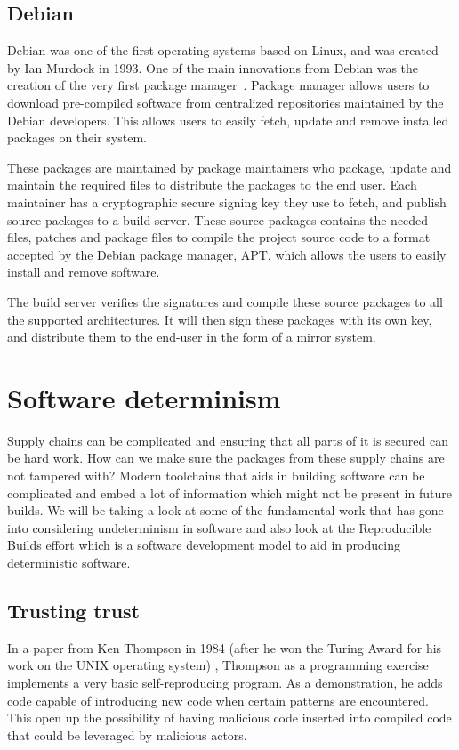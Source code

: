 \documentclass[../Main/thesis.tex]{subfiles}
\begin{document}
\subsection*{Debian}
Debian was one of the first operating systems based on Linux, and was created by
Ian Murdock in 1993. One of the main innovations from Debian was the creation of
the very first package manager~\cite{debian-history}. Package manager allows
users to download pre-compiled software from centralized repositories maintained
by the Debian developers. This allows users to easily fetch, update and remove
installed packages on their system.

These packages are maintained by package maintainers who package, update and
maintain the required files to distribute the packages to the end user. Each
maintainer has a cryptographic secure signing key they use to fetch, and publish
source packages to a build server. These source packages contains the needed
files, patches and package files to compile the project source code to a format
accepted by the Debian package manager, APT, which allows the users to easily
install and remove software.

The build server verifies the signatures and compile these source packages to
all the supported architectures. It will then sign these packages with its own
key, and distribute them to the end-user in the form of a mirror system.


\section{Software determinism}\label{sec:reproducible_builds}
Supply chains can be complicated and ensuring that all parts of it is secured
can be hard work. How can we make sure the packages from these supply chains are
not tampered with? Modern toolchains that aids in building software can be
complicated and embed a lot of information which might not be present in future
builds. We will be taking a look at some of the fundamental work that has gone
into considering undeterminism in software and also look at the Reproducible
Builds effort which is a software development model to aid in producing
deterministic software.

\subsection*{Trusting trust}
In a paper from Ken Thompson in 1984 (after he won the Turing Award for his work
on the UNIX operating system) ,
Thompson as a programming exercise implements a very basic self-reproducing
program. As a demonstration, he adds code capable of introducing new code when
certain patterns are encountered. This open up the possibility of having
malicious code inserted into compiled code that could be leveraged by malicious
actors.
\end{document}
